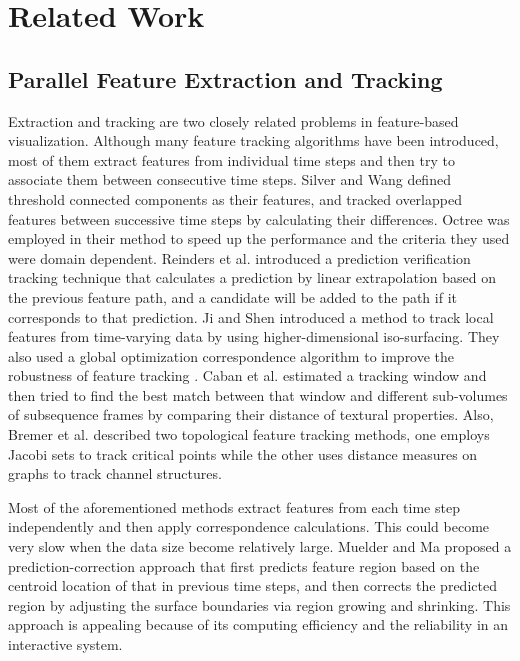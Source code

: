 \documentclass[10pt, conference, compsocconf]{IEEEtran}
\begin{document}
\section{Related Work}
\subsection{Parallel Feature Extraction and Tracking}
Extraction and tracking are two closely related problems in feature-based visualization. Although many feature tracking algorithms have been introduced, most of them extract features from individual time steps and then try to associate them between consecutive time steps. Silver and Wang \cite{Silver1997} defined threshold connected components as their features, and tracked overlapped features between successive time steps by calculating their differences. Octree was employed in their method to speed up the performance and the criteria they used were domain dependent. Reinders et al. \cite{Reinders2001} introduced a prediction verification tracking technique that calculates a prediction by linear extrapolation based on the previous feature path, and a candidate will be added to the path if it corresponds to that prediction. Ji and Shen \cite{Ji2003} introduced a method to track local features from time-varying data by using higher-dimensional iso-surfacing. They also used a global optimization correspondence algorithm to improve the robustness of feature tracking \cite{Ji2006}. Caban et al. \cite{Caban2007} estimated a tracking window and then tried to find the best match between that window and different sub-volumes of subsequence frames by comparing their distance of textural properties. Also, Bremer et al. \cite{Bremer2007} described two topological feature tracking methods, one employs Jacobi sets to track critical points while the other uses distance measures on graphs to track channel structures.

Most of the aforementioned methods extract features from each time step independently and then apply correspondence calculations. This could become very slow when the data size become relatively large. Muelder and Ma \cite{Muelder2009} proposed a prediction-correction approach that first predicts feature region based on the centroid location of that in previous time steps, and then corrects the predicted region by adjusting the surface boundaries via region growing and shrinking. This approach is appealing because of its computing efficiency and the reliability in an interactive system.
\end{document}
